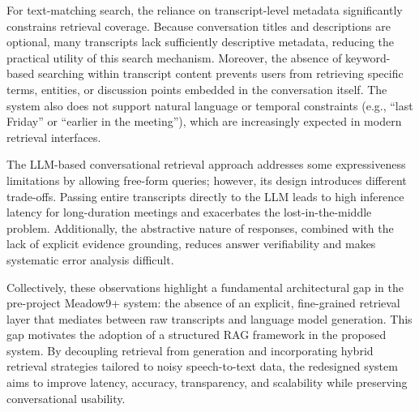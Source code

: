 For text-matching search, the reliance on transcript-level metadata significantly constrains retrieval coverage. Because conversation titles and descriptions are optional, many transcripts lack sufficiently descriptive metadata, reducing the practical utility of this search mechanism. Moreover, the absence of keyword-based searching within transcript content prevents users from retrieving specific terms, entities, or discussion points embedded in the conversation itself. The system also does not support natural language or temporal constraints (e.g., “last Friday” or “earlier in the meeting”), which are increasingly expected in modern retrieval interfaces.

The LLM-based conversational retrieval approach addresses some expressiveness limitations by allowing free-form queries; however, its design introduces different trade-offs. Passing entire transcripts directly to the LLM leads to high inference latency for long-duration meetings and exacerbates the lost-in-the-middle problem. Additionally, the abstractive nature of responses, combined with the lack of explicit evidence grounding, reduces answer verifiability and makes systematic error analysis difficult.

Collectively, these observations highlight a fundamental architectural gap in the pre-project Meadow9+ system: the absence of an explicit, fine-grained retrieval layer that mediates between raw transcripts and language model generation. This gap motivates the adoption of a structured RAG framework in the proposed system. By decoupling retrieval from generation and incorporating hybrid retrieval strategies tailored to noisy speech-to-text data, the redesigned system aims to improve latency, accuracy, transparency, and scalability while preserving conversational usability.
